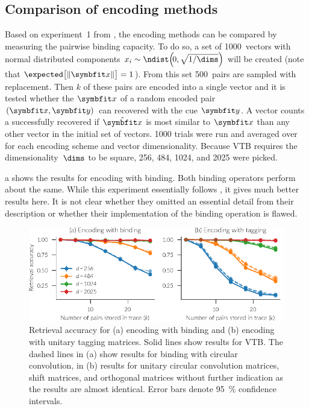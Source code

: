 \subsection{Comparison of encoding methods}
Based on experiment~1 from \textcite{recchia2015}, the encoding methods can be compared by measuring the pairwise binding capacity.
To do so, a set of \num{1000}~vectors with normal distributed components $x_i \sim \ndist\!\del{\!0, \sqrt{1/\dims}}$ will be created (note that $\expected\!\sbr{\,\norm{\vc x}} = 1$).
From this set \num{500}~pairs are sampled with replacement.
Then $k$ of these pairs are encoded into a single vector and it is tested whether the $\vc x$ of a random encoded pair $(\vc x, \vc y)$ can recovered with the cue $\vc y$.
A vector counts a successfully recovered if $\hat{\vc x}$ is most similar to $\vc x$ than any other vector in the initial set of vectors.
\num{1000} trials were run and averaged over for each encoding scheme and vector dimensionality.
Because VTB requires the dimensionality~$\dims$ to be square, \num{256}, \num{484}, \num{1024}, and \num{2025} were picked.

a shows the results for encoding with binding.
Both binding operators perform about the same.
While this experiment essentially follows \textcite{recchia2015}, it gives much better results here.
It is not clear whether they omitted an essential detail from their description or whether their implementation of the binding operation is flawed.
\begin{figure}
    \centering
    \includegraphics{figures/encoding}
    \caption[Retrieval accuracy of encoding methods]{Retrieval accuracy for (a) encoding with binding and (b) encoding with unitary tagging matrices. Solid lines show results for VTB\@. The dashed lines in (a) show results for binding with circular convolution, in (b) results for unitary circular convolution matrices, shift matrices, and orthogonal matrices without further indication as the results are almost identical. Error bars denote \SI{95}{\percent} confidence intervals.}\label{fig:encoding}
\end{figure}

